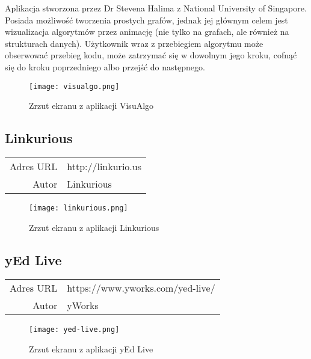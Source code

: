 Aplikacja stworzona przez Dr Stevena Halima z National University of Singapore. Posiada możliwość tworzenia prostych grafów, jednak jej głównym celem jest wizualizacja algorytmów przez animację (nie tylko na grafach, ale również na strukturach danych). Użytkownik wraz z przebiegiem algorytmu może obserwować przebieg kodu, może zatrzymać się w dowolnym jego kroku, cofnąć się do kroku poprzedniego albo przejść do następnego.

\begin{figure}[H]
\caption{Zrzut ekranu z aplikacji VisuAlgo}
\centering
\texttt{[image: visualgo.png]}
\end{figure}


\subsection*{Linkurious}
\bigskip
\noindent\begin{tabularx}{\textwidth}{r|X|}
\cline{2-2}
  Adres URL & http://linkurio.us \\ 
\cline{2-2} 
 Autor & Linkurious\\ 
\cline{2-2}
\end{tabularx}
\bigskip

\begin{figure}[H]
\caption{Zrzut ekranu z aplikacji Linkurious}
\centering
\texttt{[image: linkurious.png]}
\end{figure}

\subsection*{yEd Live}
\bigskip
\noindent\begin{tabularx}{\textwidth}{r|X|}
\cline{2-2}
  Adres URL & https://www.yworks.com/yed-live/ \\ 
\cline{2-2} 
 Autor & yWorks\\ 
\cline{2-2}
\end{tabularx}
\bigskip

\begin{figure}[H]
\caption{Zrzut ekranu z aplikacji yEd Live}
\centering
\texttt{[image: yed-live.png]}
\end{figure}

